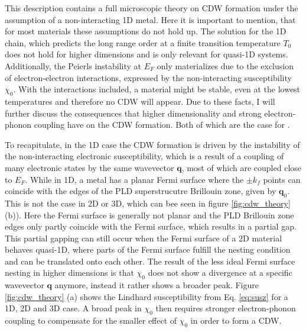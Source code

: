 This description contains a full microscopic theory on CDW formation under the assumption of a non-interacting 1D metal.
Here it is important to mention, that for most materials these assumptions do not hold up.
The solution for the 1D chain, which predicts the long range order at a finite transition temperature $T_0$ does not hold for higher dimensions and is only relevant for quasi-1D systems.
Additionally, the Peierls instability at $E_F$ only materializes due to the exclusion of electron-electron interactions, expressed by the non-interacting susceptibility $\chi_0$.
With the interactions included, a material might be stable, even at the lowest temperatures and therefore no CDW will appear.
Due to these facts, I will further discuss the consequences that higher dimensionality and strong electron-phonon coupling have on the CDW formation.
Both of which are the case for .

To recapitulate, in the 1D case the CDW formation is driven by the instability of the non-interacting electronic susceptibility, which is a result of a coupling of many electronic states by the same wavevector $\mathbf{q}$, most of which are coupled close to $E_F$.
While in 1D, a metal has a planar Fermi surface where the $\pm k_f$ points can coincide with the edges of the PLD superstrucutre Brillouin zone, given by $\mathbf{q}_0$.
This is not the case in 2D or 3D, which can bee seen in figure \ref{fig:cdw_theory} (b)).
Here the Fermi surface is generally not planar and the PLD Brillouin zone edges only partly coincide with the Fermi surface, which results in a partial gap.
This partial gapping can still occur when the Fermi surface of a 2D material behaves quasi-1D, where parts of the Fermi surface fulfill the nesting condition and can be translated onto each other.
The result of the less ideal Fermi surface nesting in higher dimensions is that $\chi_0$ does not show a divergence at a specific wavevector $\mathbf{q}$ anymore, instead it rather shows a broader peak.
Figure \ref{fig:cdw_theory} (a) shows the Lindhard susceptibility from Eq. \ref{eq:susz} for a 1D, 2D and 3D case.
A broad peak in $\chi_0$ then requires stronger electron-phonon coupling to compensate for the smaller effect of $\chi_0$ in order to form a CDW.

